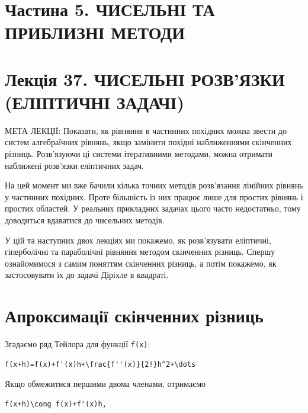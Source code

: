 \documentclass[
  ukrainian,
]{article}
\begin{document}
\section{Частина 5. ЧИСЕЛЬНІ ТА ПРИБЛИЗНІ
МЕТОДИ}\label{ux447ux430ux441ux442ux438ux43dux430-5.-ux447ux438ux441ux435ux43bux44cux43dux456-ux442ux430-ux43fux440ux438ux431ux43bux438ux437ux43dux456-ux43cux435ux442ux43eux434ux438}

\section{Лекція 37. ЧИСЕЛЬНІ РОЗВ'ЯЗКИ (ЕЛІПТИЧНІ
ЗАДАЧІ)}\label{ux43bux435ux43aux446ux456ux44f-37.-ux447ux438ux441ux435ux43bux44cux43dux456-ux440ux43eux437ux432ux44fux437ux43aux438-ux435ux43bux456ux43fux442ux438ux447ux43dux456-ux437ux430ux434ux430ux447ux456}

МЕТА ЛЕКЦІЇ: Показати, як рівняння в частинних похідних можна звести до
систем алгебраїчних рівнянь, якщо замінити похідні наближеннями
скінченних різниць. Розв'язуючи ці системи ітеративними методами, можна
отримати наближені розв'язки еліптичних задач.

На цей момент ми вже бачили кілька точних методів розв'язання лінійних
рівнянь у частинних похідних. Проте більшість із них працює лише для
простих рівнянь і простих областей. У реальних прикладних задачах цього
часто недостатньо, тому доводиться вдаватися до чисельних методів.

У цій та наступних двох лекціях ми покажемо, як розв'язувати еліптичні,
гіперболічні та параболічні рівняння методом скінченних різниць. Спершу
ознайомимося з самим поняттям скінченних різниць, а потім покажемо, як
застосовувати їх до задачі Діріхле в квадраті.

\section{Апроксимації скінченних
різниць}\label{ux430ux43fux440ux43eux43aux441ux438ux43cux430ux446ux456ux457-ux441ux43aux456ux43dux447ux435ux43dux43dux438ux445-ux440ux456ux437ux43dux438ux446ux44c}

Згадаємо ряд Тейлора для функції \texttt{f(x)}:

\begin{verbatim}
f(x+h)=f(x)+f'(x)h+\frac{f''(x)}{2!}h^2+\dots
\end{verbatim}

Якщо обмежитися першими двома членами, отримаємо

\begin{verbatim}
f(x+h)\cong f(x)+f'(x)h,
\end{verbatim}
\end{document}
